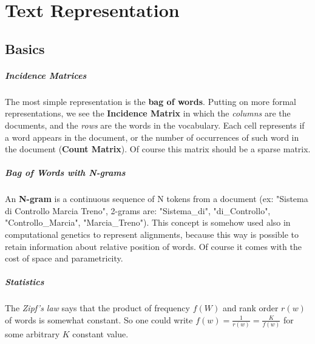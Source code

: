 \chapter{Text Representation}

\section{Basics}

\paragraph{Incidence Matrices}

The most simple representation is the \textbf{bag of words}. Putting on more formal representations, we see the \textbf{Incidence Matrix} in which the \textit{columns} are the documents, and the \textit{rows} are the words in the vocabulary. Each cell represents if a word appears in the document, or the number of occurrences of such word in the document (\textbf{Count Matrix}). Of course this matrix should be a sparse matrix.

\paragraph{Bag of Words with N-grams}

An \textbf{N-gram} is a continuous sequence of N tokens from a document (ex: "Sistema di Controllo Marcia Treno", 2-grams are: "Sistema_di", "di_Controllo", "Controllo_Marcia", "Marcia_Treno").
This concept is somehow used also in computational genetics to represent alignments, because this way is possible to retain information about relative position of words.
Of course it comes with the cost of space and parametricity.

\paragraph{Statistics}

The \textit{Zipf's law} says that the product of frequency $f(W)$ and rank order $r(w)$ of words is somewhat constant. So one could write $f(w) = \frac 1 {r(w)} = \frac K {f(w)}$ for some arbitrary $K$ constant value.
